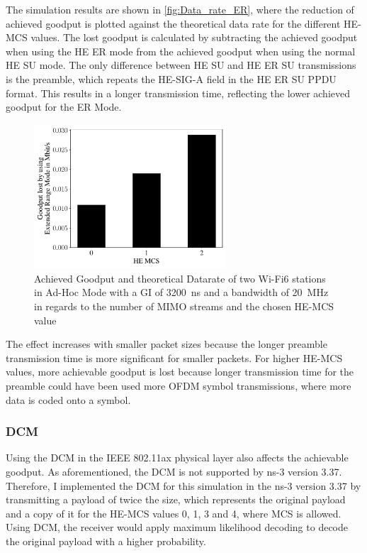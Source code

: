 The simulation results are shown in \autoref{fig:Data_rate_ER}, where the reduction of achieved goodput is plotted against the theoretical data rate for the different \ac{HE}-\ac{MCS} values.
The lost goodput is calculated by subtracting the achieved goodput when using the \ac{HE} \ac{ER} mode from the achieved goodput when using the normal \ac{HE} SU mode.
The only difference between \ac{HE} SU and \ac{HE} \ac{ER} SU transmissions is the preamble, which repeats the \ac{HE}-SIG-A field in the \ac{HE} \ac{ER} SU \ac{PPDU} format.
This results in a longer transmission time, reflecting the lower achieved goodput for the \ac{ER} Mode.
\begin{figure}[H]%
   \centering
   \includegraphics[width=0.64\textwidth]{figures/ER_dataRate_simulation.pdf}
   \caption{Achieved Goodput and theoretical Datarate of two Wi-Fi6 stations in Ad-Hoc Mode with a \acf{GI} of \SI{3200}{\nano\second} and a bandwidth of \SI{20}{\mega\hertz} in regards to the number of \acf{MIMO} streams and the chosen \ac{HE}-\ac{MCS} value}%
   \label{fig:Data_rate_ER}%
\end{figure}
The effect increases with smaller packet sizes because the longer preamble transmission time is more significant for smaller packets.
For higher \ac{HE}-\ac{MCS} values, more achievable goodput is lost because longer transmission time for the preamble could have
been used more \ac{OFDM} symbol transmissions, where more data is coded onto a symbol.

\subsubsection*{\acf{DCM}}
Using the \ac{DCM} in the IEEE 802.11ax physical layer also affects the achievable goodput.
As aforementioned, the \ac{DCM} is not supported by ns-3 version 3.37.
Therefore, I implemented the \ac{DCM} for this simulation in the ns-3 version 3.37 by transmitting a payload of twice the size, which represents the original payload and a
copy of it for the \ac{HE}-\ac{MCS} values 0, 1, 3 and 4, where \ac{MCS} is allowed.
Using \ac{DCM}, the receiver would apply maximum likelihood decoding to decode the original payload with a higher probability.

